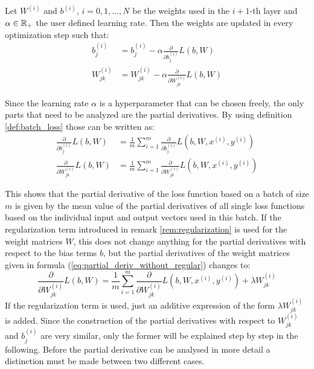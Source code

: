 \begin{remark}\label{rem:update}
	Let $W^{(i)}$ and $b^{(i)}$, $i = 0, 1, ..., N$ be the weights used in the $i+1$-th layer and $\alpha \in  \mathbb{R}_+$ the user defined learning rate. Then the weights are updated in every optimization step such that:
	\begin{align}
	b_j^{(i)} 		&= b_j^{(i)} - \alpha \frac{\partial}{\partial b_j^{(i)}} L(b, W)\\
	W_{jk}^{(i)} 	&= W_{jk}^{(i)} - \alpha \frac{\partial}{\partial W_{jk}^{(i)}} L(b, W)
	\end{align}	
\end{remark}

Since the learning rate $\alpha$ is a hyperparameter that can be chosen freely, the only parts that need to be analyzed are the partial derivatives. By using definition \ref{def:batch_loss} those can be written as:
\begin{align}
	\frac{\partial}{\partial b_j^{(i)}} L(b, W) 	&= \frac{1}{m} \sum_{i = 1}^m \frac{\partial}{\partial b_j^{(i)}} L(b, W, x^{(i)}, y^{(i)}) \label{eq:partial_deriv_without_regular_one} \\ 
	\frac{\partial}{\partial W_{jk}^{(i)}} L(b, W)	&= \frac{1}{m} \sum_{i = 1}^m \frac{\partial}{\partial W_{jk}^{(i)}} L(b, W, x^{(i)}, y^{(i)}) \label{eq:partial_deriv_without_regular}
\end{align}

This shows that the partial derivative of the loss function based on a batch of size $m$ is given by the mean value of the partial derivatives of all single loss functions based on the individual input and output vectors used in this batch. If the regularization term introduced in remark \ref{rem:regularization} is used for the weight matrices $W$, this does not change anything for the partial derivatives with respect to the bias terms $b$, but the partial derivatives of the weight matrices given in formula (\ref{eq:partial_deriv_without_regular}) changes to:
\begin{equation}
		\frac{\partial}{\partial W_{jk}^{(i)}} L(b, W) = \frac{1}{m} \sum_{i = 1}^m \frac{\partial}{\partial W_{jk}^{(i)}} L(b, W, x^{(i)}, y^{(i)}) + \lambda  W_{jk}^{(i)}
\end{equation}
If the regularization term is used, just an additive expression of the form $\lambda W_{jk}^{(i)}$ is added. Since the construction of the partial derivatives with respect to $W_{jk}^{(i)}$ and $b_j^{(i)}$ are very similar, only the former will be explained step by step in the following. Before the partial derivative can be analysed in more detail a distinction must be made between two different cases.

